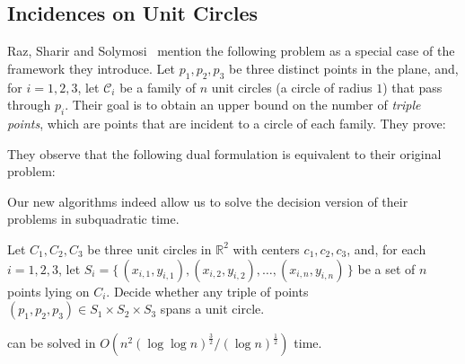 \subsection{Incidences on Unit Circles}%
\label{sec:paper:3pol-algorithm:application:circles}

Raz, Sharir and Solymosi~\cite{RSS15} mention the following problem as a
special case of the framework they introduce.
Let $p_1,p_2,p_3$ be three distinct points in the plane, and, for $i=1,2,3$,
let $\mathcal{C}_i$ be a family of $n$ unit circles (a circle of radius $1$)
that pass through $p_i$.  Their goal is to obtain an upper bound on the number
of \emph{triple points}, which are points that are incident to a circle of each
family.
%
They prove:


They observe that the following dual formulation is equivalent to their
original problem:


Our new algorithms indeed allow us to solve the decision version of their
problems in subquadratic time.
\begin{problem}[%
	label=problem:UCSPTUC%
]
	Let $C_1,C_2,C_3$ be three unit circles in $\mathbb{R}^2$ with centers
	$c_1,c_2,c_3$, and, for each $i=1,2,3$, let $S_i =
	\{\,(x_{i,1},y_{i,1}),(x_{i,2},y_{i,2}),\ldots,(x_{i,n},y_{i,n})\,\}$ be a
	set of $n$ points lying on $C_i$. Decide whether any triple of points
	$(p_1,p_2,p_3) \in S_1 \times S_2 \times S_3$ spans a unit circle.
\end{problem}

\begin{theorem}
	 can be solved in
	$O(n^2 {(\log \log n)}^\frac{3}{2} / {(\log n)}^\frac{1}{2})$ time.
\end{theorem}

